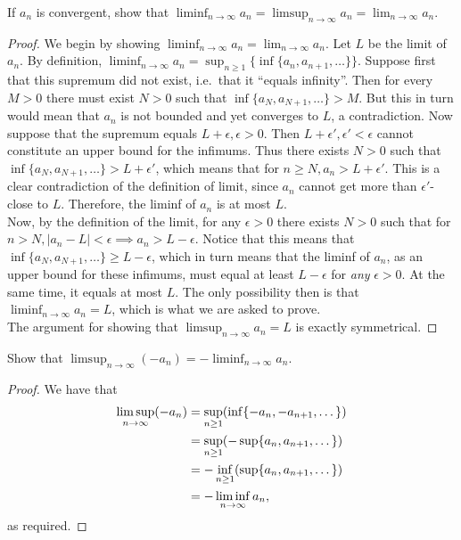 \begin{exercise}{23}
    If $a_n$ is convergent, show that $\liminf_{n\rightarrow \infty} a_n = \limsup_{n \rightarrow \infty} a_n = \lim_{n \rightarrow \infty} a_n$.
\end{exercise}
\begin{proof}
    We begin by showing $\liminf_{n\rightarrow \infty} a_n = \lim_{n \rightarrow \infty} a_n$. Let $L$ be the limit of $a_n$. By definition, $\liminf_{n\rightarrow \infty} a_n = \sup_{n \geq 1} \{\inf\{a_n, a_{n+1}, \ldots\}\}$. Suppose first that this supremum did not exist, i.e.\ that it ``equals infinity''. Then for every $M > 0$ there must exist $N > 0$ such that $\inf\{a_N, a_{N+1}, \ldots\} > M$. But this in turn would mean that $a_n$ is not bounded and yet converges to $L$, a contradiction. Now suppose that the supremum equals $L + \epsilon, \epsilon > 0$. Then $L + \epsilon', \epsilon' < \epsilon$ cannot constitute an upper bound for the infimums. Thus there exists $N > 0$ such that $\inf\{a_N, a_{N+1}, \ldots\} > L + \epsilon'$, which means that for $n \geq N, a_n > L + \epsilon'$. This is a clear contradiction of the definition of limit, since $a_n$ cannot get more than $\epsilon'$-close to $L$. Therefore, the liminf of $a_n$ is at most $L$.\\

    Now, by the definition of the limit, for any $\epsilon > 0$ there exists $N > 0$ such that for $n > N, \lvert a_n - L \rvert < \epsilon \implies a_n > L - \epsilon$. Notice that this means that $\inf\{a_{N}, a_{N+1}, \ldots\} \geq L - \epsilon$, which in turn means that the liminf of $a_n$, as an upper bound for these infimums, must equal at least $L - \epsilon$ for \textit{any} $\epsilon > 0$. At the same time, it equals at most $L$. The only possibility then is that $\liminf_{n\rightarrow \infty} a_n = L$, which is what we are asked to prove.\\

    The argument for showing that $\limsup_{n\rightarrow \infty} a_n = L$ is exactly symmetrical.
\end{proof}

\begin{exercise}{24}
Show that $\limsup_{n\to\infty}(-a_n)=-\liminf_{n\to\infty}a_n$.
\end{exercise}
\begin{proof}
We have that
\begin{align*}
    \limsup_{n\to\infty}(-a_n) &= \sup_{n\geq 1}(\inf\{-a_n,-a_{n+1},\dots\})\\
    &= \sup_{n\geq 1}(-\sup\{a_n,a_{n+1},\dots\})\\
    &= -\inf_{n\geq 1}(\sup\{a_n,a_{n+1},\dots\})\\
    &= -\liminf_{n\to\infty}a_n,
\end{align*}
as required.
\end{proof}

